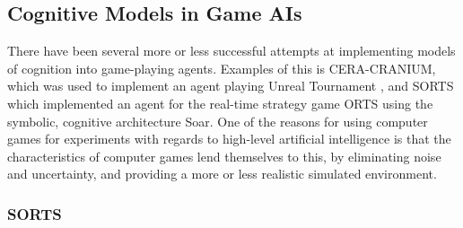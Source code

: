 \subsection{Cognitive Models in Game AIs}
There have been several more or less successful attempts at implementing models of cognition into game-playing agents. Examples of this is CERA-CRANIUM, which was used to implement an agent playing Unreal Tournament \cite{arrabales2009ceracranium}, and SORTS which implemented an agent for the real-time strategy game ORTS using the symbolic, cognitive architecture Soar.\cite{wintermute2007sorts} One of the reasons for using computer games for experiments with regards to high-level artificial intelligence is that the characteristics of computer games lend themselves to this, by eliminating noise and uncertainty, and providing a more or less realistic simulated environment.

\subsubsection{SORTS}